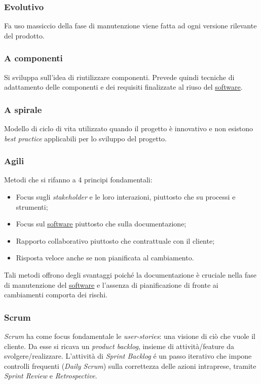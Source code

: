 		
		\subsubsection{Evolutivo}
			Fa uso massiccio della fase di manutenzione viene fatta ad ogni versione rilevante del prodotto.

		
		\subsubsection{A componenti}
			Si sviluppa sull'idea di riutilizzare componenti. Prevede quindi tecniche di adattamento delle componenti e dei requisiti finalizzate al riuso del \underline{\hyperref[sec:prodottosoftware]{software}}.

		
		\subsubsection{A spirale}
				Modello di ciclo di vita utilizzato quando il progetto è innovativo e non esistono \emph{best practice} applicabili per lo sviluppo del progetto.

		
		\subsubsection{Agili}
		Metodi che si rifanno a 4 principi fondamentali:
			\begin{itemize}
			\item Focus sugli \emph{stakeholder} e le loro interazioni, piuttosto che su processi e strumenti;
			\item Focus sul \underline{\hyperref[sec:prodottosoftware]{software}} piuttosto che sulla documentazione;
			\item Rapporto collaborativo piuttosto che contrattuale con il cliente;
			\item Risposta veloce anche se non pianificata al cambiamento.
			\end{itemize}
		Tali metodi offrono degli svantaggi poiché la documentazione è cruciale nella fase di manutenzione del \underline{\hyperref[sec:prodottosoftware]{software}} e l'assenza di pianificazione di fronte ai cambiamenti comporta dei rischi.

			
			\subsubsection{Scrum}
				\emph{Scrum} ha come focus fondamentale le  \emph{user-stories}: una visione di ciò che vuole il cliente. Da esse si ricava un \emph{product backlog}, insieme di attività/feature da svolgere/realizzare. L'attività di \emph{Sprint Backlog} é un passo iterativo che impone controlli frequenti (\emph{Daily Scrum}) sulla correttezza delle azioni intraprese, tramite \emph{Sprint Review} e \emph{Retrospective}.
				
